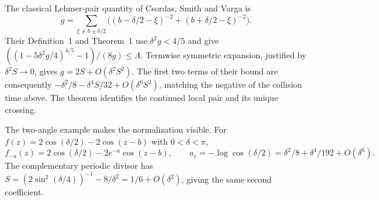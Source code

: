 The classical Lehmer-pair quantity of Csordas, Smith and Varga is
\[
 g=\sum_{\xi\ne b\pm\delta/2}
 \bigl((b-\delta/2-\xi)^{-2}+(b+\delta/2-\xi)^{-2}\bigr).
\]
Their Definition~1 and Theorem~1 \cite[pp.~109--110]{csv} use
$\delta^2g<4/5$ and give
$((1-5\delta^2g/4)^{4/5}-1)/(8g)\le\Lambda$.
Termwise symmetric expansion, justified by $\delta^2S\to0$, gives
$g=2S+O(\delta^2S^2)$. The first two terms of their bound are consequently
$-\delta^2/8-\delta^4S/32+O(\delta^6S^2)$, matching the negative of the collision time above. The theorem identifies the continued local pair and its unique crossing.

The two-angle example makes the normalization visible. For
$f(z)=2\cos(\delta/2)-2\cos(z-b)$ with $0<\delta<\pi$,
\[
 f_{-a}(z)=2\cos(\delta/2)-2e^{-a}\cos(z-b),\qquad
 a_c=-\log\cos(\delta/2)=\delta^2/8+\delta^4/192+O(\delta^6).
\]
The complementary periodic divisor has
$S=(2\sin^2(\delta/4))^{-1}-8/\delta^2=1/6+O(\delta^2)$, giving the same second coefficient.
